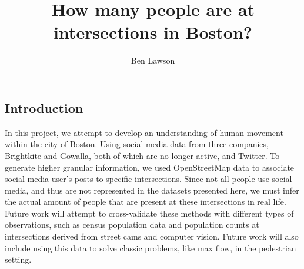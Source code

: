 \documentclass{lposter}
\author{Ben Lawson}
\title{How many people are at intersections in Boston?}
\theoremstyle{plain}
\theoremstyle{definition}
\begin{document}
\begin{poster}
\section{Introduction}
In this project, we attempt to develop an understanding of human movement within the city of Boston. Using social media data from three companies, Brightkite and Gowalla, both of which are no longer active, and Twitter. To generate higher granular information, we used OpenStreetMap data to associate social media user's posts to specific intersections. Since not all people use social media, and thus are not represented in the datasets presented here, we must infer the actual amount of people that are present at these intersections in real life. Future work will attempt to cross-validate these methods with different types of observations, such as census population data and population counts at intersections derived from street cams and computer vision. Future work will also include using this data to solve classic problems, like max flow, in the pedestrian setting. 

\end{poster}
\end{document}
